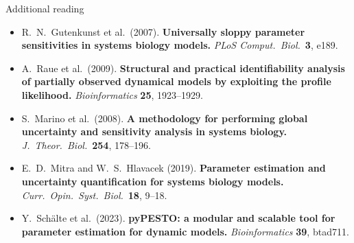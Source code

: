 \documentclass[aspectratio=169,10pt,t]{beamer}
\begin{document}
\begin{frame}{Additional reading}
  \small
  \begin{itemize}
    \setlength\itemsep{1.5mm}
    \item R.~N.~Gutenkunst et al.\ (2007). \textbf{Universally sloppy parameter
          sensitivities in systems biology models.} \emph{PLoS Comput.\ Biol.}\
          \textbf{3}, e189.
    \item A.~Raue et al.\ (2009). \textbf{Structural and practical identifiability
          analysis of partially observed dynamical models by exploiting the profile
          likelihood.} \emph{Bioinformatics} \textbf{25}, 1923--1929.
    \item S.~Marino et al.\ (2008). \textbf{A methodology for performing global
          uncertainty and sensitivity analysis in systems biology.} \emph{J.\ Theor.\
          Biol.}\ \textbf{254}, 178--196.
    \item E.~D.~Mitra and W.~S.~Hlavacek (2019). \textbf{Parameter estimation and
          uncertainty quantification for systems biology models.} \emph{Curr.\ Opin.\
          Syst.\ Biol.}\ \textbf{18}, 9--18.
    \item Y.~Sch\"alte et al.\ (2023). \textbf{pyPESTO: a modular and scalable tool for
          parameter estimation for dynamic models.} \emph{Bioinformatics} \textbf{39},
          btad711.
  \end{itemize}
\end{frame}
\end{document}
